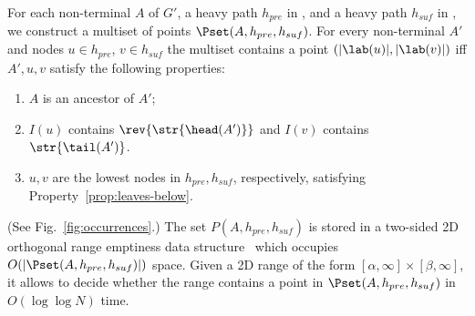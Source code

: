 For each non-terminal $A$ of $G'$, a heavy path $h_{pre}$ in \Tpre, and a heavy path $h_{suf}$ in \Tsuf, we construct a multiset of points $\Pset(A,h_{pre},h_{suf})$. For every non-terminal $A'$ and nodes $u \in h_{pre}$, $v \in h_{suf}$ the multiset contains a point $(|\lab(u)|, |\lab(v)|)$ iff $A', u, v$ satisfy the following properties:
\begin{enumerate}
\item $A$ is an ancestor of $A'$;
\item  \label{prop:leaves-below} $I(u)$ contains $\rev{\str{\head(A')}} $ and $I(v)$ contains $\str{\tail(A')} $. 
\item $u,v$ are the lowest nodes in $h_{pre}, h_{suf}$, respectively, satisfying Property~\ref{prop:leaves-below}.
\end{enumerate}
(See Fig.~\ref{fig:occurrences}.) The set 
$P(A,h_{pre},h_{suf})$ is stored in a two-sided 2D orthogonal range emptiness data structure~\cite{Lewenstein13,journals/talg/Chan13} which occupies  $O(|\Pset(A,h_{pre},h_{suf})|)$ space. 
 Given a 2D range of the form $[\alpha,\infty]\times[\beta,\infty]$, it allows to decide whether the range contains a point in $\Pset(A,h_{pre},h_{suf})$ in $O(\log\log N)$ time.
 

